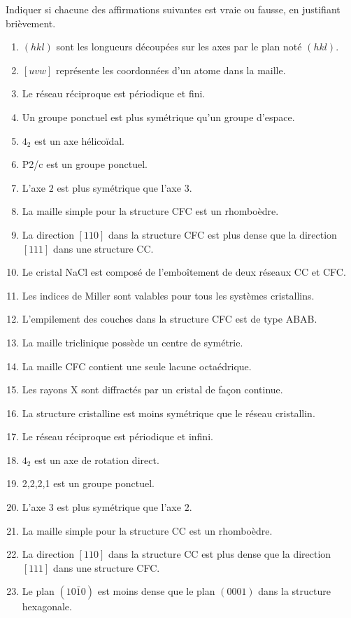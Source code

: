 \documentclass[12pt,a4paper]{article}
\begin{document}
\begin{boiteexercice}
\niveau{\facile}
Indiquer si chacune des affirmations suivantes est vraie ou fausse, en justifiant brièvement.

\begin{enumerate}
\item $(hkl)$ sont les longueurs découpées sur les axes par le plan noté $(hkl)$.
\item $[uvw]$ représente les coordonnées d'un atome dans la maille.
\item Le réseau réciproque est périodique et fini.
\item Un groupe ponctuel est plus symétrique qu'un groupe d'espace.
\item $4_2$ est un axe hélicoïdal.
\item P2/c est un groupe ponctuel.
\item L'axe $2$ est plus symétrique que l'axe $3$.
\item La maille simple pour la structure CFC est un rhomboèdre.
\item La direction $[110]$ dans la structure CFC est plus dense que la direction $[111]$ dans une structure CC.
\item Le cristal NaCl est composé de l'emboîtement de deux réseaux CC et CFC.
\item Les indices de Miller sont valables pour tous les systèmes cristallins.
\item L'empilement des couches dans la structure CFC est de type ABAB.
\item La maille triclinique possède un centre de symétrie.
\item La maille CFC contient une seule lacune octaédrique.
\item Les rayons X sont diffractés par un cristal de façon continue.
\item La structure cristalline est moins symétrique que le réseau cristallin.
\item Le réseau réciproque est périodique et infini.
\item $4_2$ est un axe de rotation direct.
\item 2,2,2,1 est un groupe ponctuel.
\item L'axe $3$ est plus symétrique que l'axe $2$.
\item La maille simple pour la structure CC est un rhomboèdre.
\item La direction $[110]$ dans la structure CC est plus dense que la direction $[111]$ dans une structure CFC.
\item Le plan $(10\bar{1}0)$ est moins dense que le plan $(0001)$ dans la structure hexagonale.

\end{enumerate}
\end{boiteexercice}
\end{document}
